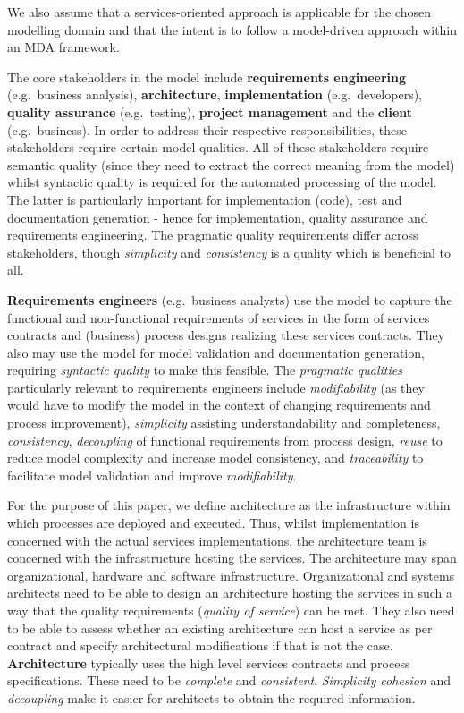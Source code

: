 We also assume that a services-oriented approach is applicable for the chosen modelling domain and that the intent is to follow a model-driven approach within an MDA framework.

The core stakeholders in the model include {\bf requirements engineering} (e.g.\ business analysis), {\bf architecture}, {\bf implementation} (e.g.\ developers), {\bf quality assurance} (e.g.\ testing), {\bf project management} and the {\bf client} (e.g.\ business). In order to address their respective responsibilities, these stakeholders require certain model qualities. All of these stakeholders require semantic quality (since they need to extract the correct meaning from the model) whilst syntactic quality is required for the automated processing of the model. The latter is particularly important for implementation (code), test and documentation generation - hence for implementation, quality assurance and requirements engineering. The pragmatic quality requirements differ across stakeholders, though \emph{simplicity} and \emph{consistency} is a quality which is beneficial to all.

{\bf Requirements engineers} (e.g.\ business analysts) use the model to capture the functional and non-functional requirements of services in the form of services contracts and (business) process designs realizing these services contracts. They also may use the model for model validation and documentation generation, requiring \emph{syntactic quality} to make this feasible.  The \emph{pragmatic qualities} particularly relevant to requirements engineers include \emph{modifiability} (as they would have to modify the model in the context of changing requirements and process improvement), \emph{simplicity} assisting understandability and completeness, \emph{consistency}, \emph{decoupling} of functional requirements from process design, \emph{reuse} to reduce model complexity and increase model consistency, and \emph{traceability} to facilitate model validation and improve \emph{modifiability}. 

For the purpose of this paper, we define architecture as the infrastructure within which processes are deployed and executed. Thus, whilst implementation is concerned with the actual services implementations, the architecture team is concerned with the infrastructure hosting the services. The architecture may span organizational, hardware and software infrastructure. Organizational and systems architects need to be able to design an architecture hosting the services in such a way that the quality requirements (\emph{quality of service}) can be met. They also need to be able to assess whether an existing architecture can host a service as per contract and specify architectural modifications if that is not the case. {\bf Architecture} typically uses the high level services contracts and process specifications. These need to be \emph{complete} and \emph{consistent}. \emph{Simplicity} \emph{cohesion} and \emph{decoupling} make it easier for architects to obtain the required information.

